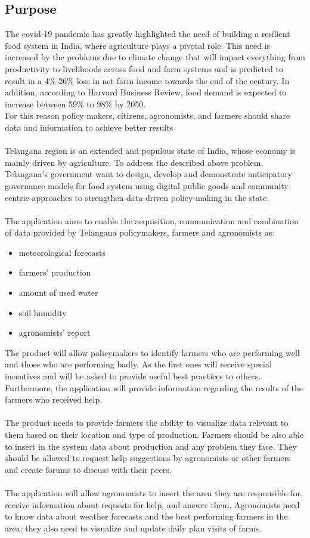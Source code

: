 \subsection{Purpose}
The covid-19 pandemic has greatly highlighted the need of building a resilient food system in India, 
where agriculture plays a pivotal role. 
This need is increased by the problems due to climate change that will impact everything from productivity to 
livelihoods across food and farm systems and is predicted to result in a 4\%-26\% loss in net farm income towards the end of the century.
In addition, according to Harvard Business Review, food demand is expected to increase between 59\% to 98\% by 2050.\\
For this reason policy makers, citizens, agronomists, and farmers should share data and information to achieve better results 
\\\\
Telangana region is an extended and populous state of India, whose economy is mainly driven by agriculture. 
To address the described above problem, Telangana's government want to design, 
develop and demonstrate anticipatory governance models for food system using digital 
public goods and community-centric approaches to strengthen data-driven policy-making in the state.
\\\\
The application aims to enable the acquisition, communication and combination of data provided by Telangana policymakers, 
farmers and agronomists as:
\begin{itemize}
    \item meteorological forecasts
    \item farmers' production
    \item amount of used water
    \item soil humidity
    \item agronomists' report
\end{itemize}
\bigskip
The product will allow policymakers to identify farmers who are performing well and those who are performing badly. 
As the first ones will receive special incentives and will be asked to provide useful best practices to others. 
Furthermore, the application will provide information regarding the results of the farmers who received help.
\\\\
The product needs to provide farmers the ability to visualize data relevant to them based on their location and type of production. 
Farmers should be also able to insert in the system data about production and any problem they face. 
They should be allowed to request help suggestions by agronomists or other farmers and create forums to discuss with their peers.
\\\\
The application will allow agronomists to insert the area they are responsible for, receive information about requests for help, 
and answer them. Agronomists need to know data about weather forecasts and the best performing farmers in the area; 
they also need to visualize and update daily plan visits of farms.

